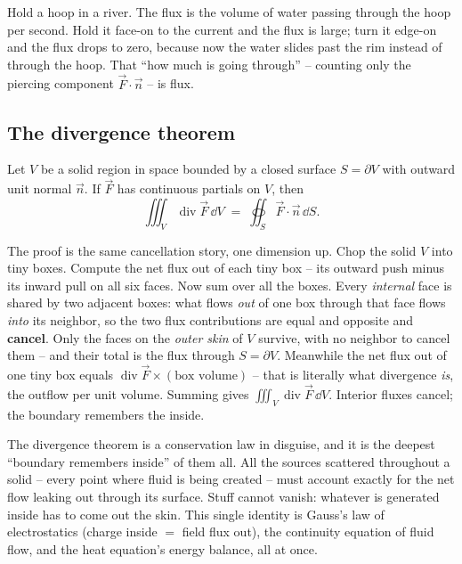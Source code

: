 \begin{intuitionbox}
Hold a hoop in a river. The flux is the volume of water passing through the hoop
per second. Hold it face-on to the current and the flux is large; turn it edge-on
and the flux drops to zero, because now the water slides past the rim instead of
through the hoop. That ``how much is going through'' -- counting only the piercing
component $\vec F\cdot\vec n$ -- is flux.
\end{intuitionbox}

\subsection{The divergence theorem}

\begin{theorem}
\label{ch35:thm-div}
Let $V$ be a solid region in space bounded by a closed surface $S=\partial V$ with
outward unit normal $\vec n$. If $\vec F$ has continuous partials on $V$, then
\[
  \iiint_V \operatorname{div}\vec F\,\dd V \;=\; \oiint_{S}\vec F\cdot\vec n\,\dd S.
\]
\end{theorem}

\begin{happeningbox}
The proof is the same cancellation story, one dimension up. Chop the solid $V$ into
tiny boxes. Compute the net flux out of each tiny box -- its outward push minus its
inward pull on all six faces. Now sum over all the boxes. Every \emph{internal}
face is shared by two adjacent boxes: what flows \emph{out} of one box through that
face flows \emph{into} its neighbor, so the two flux contributions are equal and
opposite and \textbf{cancel}. Only the faces on the \emph{outer skin} of $V$
survive, with no neighbor to cancel them -- and their total is the flux through
$S=\partial V$. Meanwhile the net flux out of one tiny box equals
$\operatorname{div}\vec F\times(\text{box volume})$ -- that is literally what
divergence \emph{is}, the outflow per unit volume. Summing gives
$\iiint_V \operatorname{div}\vec F\,\dd V$. Interior fluxes cancel; the boundary
remembers the inside.
\end{happeningbox}

\begin{aestheticbox}
The divergence theorem is a conservation law in disguise, and it is the deepest
``boundary remembers inside'' of them all. All the sources scattered throughout a
solid -- every point where fluid is being created -- must account exactly for the
net flow leaking out through its surface. Stuff cannot vanish: whatever is generated
inside has to come out the skin. This single identity is Gauss's law of
electrostatics (charge inside $=$ field flux out), the continuity equation of fluid
flow, and the heat equation's energy balance, all at once.
\end{aestheticbox}

